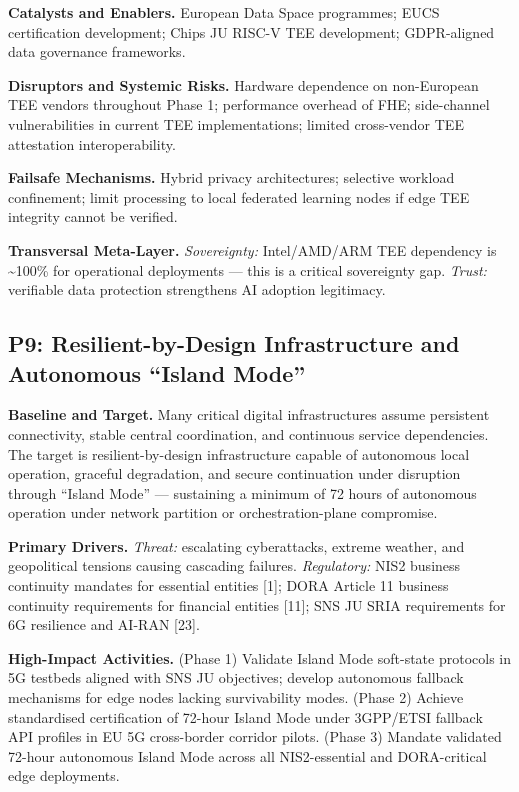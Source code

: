 \documentclass{ieeeaccess}
\begin{document}
\textbf{Catalysts and Enablers.} European Data Space programmes; EUCS
certification development; Chips JU RISC-V TEE development; GDPR-aligned
data governance frameworks.

\textbf{Disruptors and Systemic Risks.} Hardware dependence on
non-European TEE vendors throughout Phase 1; performance overhead of
FHE; side-channel vulnerabilities in current TEE implementations;
limited cross-vendor TEE attestation interoperability.

\textbf{Failsafe Mechanisms.} Hybrid privacy architectures; selective
workload confinement; limit processing to local federated learning nodes
if edge TEE integrity cannot be verified.

\textbf{Transversal Meta-Layer.} \emph{Sovereignty:} Intel/AMD/ARM TEE
dependency is \textasciitilde100\% for operational deployments --- this
is a critical sovereignty gap. \emph{Trust:} verifiable data protection
strengthens AI adoption legitimacy.

\subsection{P9: Resilient-by-Design Infrastructure and Autonomous
``Island
Mode''}\label{p9-resilient-by-design-infrastructure-and-autonomous-island-mode}

\textbf{Baseline and Target.} Many critical digital infrastructures
assume persistent connectivity, stable central coordination, and
continuous service dependencies. The target is resilient-by-design
infrastructure capable of autonomous local operation, graceful
degradation, and secure continuation under disruption through ``Island
Mode'' --- sustaining a minimum of 72 hours of autonomous operation
under network partition or orchestration-plane compromise.

\textbf{Primary Drivers.} \emph{Threat:} escalating cyberattacks,
extreme weather, and geopolitical tensions causing cascading failures.
\emph{Regulatory:} NIS2 business continuity mandates for essential
entities {[}1{]}; DORA Article 11 business continuity requirements for
financial entities {[}11{]}; SNS JU SRIA requirements for 6G resilience
and AI-RAN {[}23{]}.

\textbf{High-Impact Activities.} (Phase 1) Validate Island Mode
soft-state protocols in 5G testbeds aligned with SNS JU objectives;
develop autonomous fallback mechanisms for edge nodes lacking
survivability modes. (Phase 2) Achieve standardised certification of
72-hour Island Mode under 3GPP/ETSI fallback API profiles in EU 5G
cross-border corridor pilots. (Phase 3) Mandate validated 72-hour
autonomous Island Mode across all NIS2-essential and DORA-critical edge
deployments.
\end{document}
